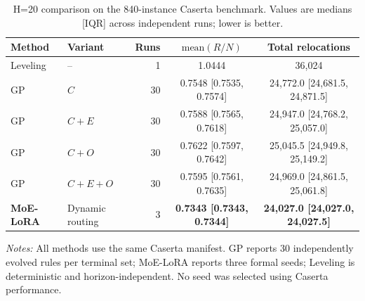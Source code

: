 \begin{table}[t]
  \centering
  \caption{H=20 comparison on the 840-instance Caserta benchmark. Values are
  medians [IQR] across independent runs; lower is better.}
  \label{tab:gp_moe_leveling_h20}
  \setlength{\tabcolsep}{4.5pt}
  \renewcommand{\arraystretch}{1.08}
  \small
  \begin{tabular}{llrcc}
    \toprule
    Method & Variant & Runs & $\mathrm{mean}(R/N)$ & Total relocations \\
    \midrule
    Leveling & -- & 1 & 1.0444 & 36,024 \\
    GP & $C$ & 30 & 0.7548 [0.7535, 0.7574] & 24,772.0 [24,681.5, 24,871.5] \\
    GP & $C{+}E$ & 30 & 0.7588 [0.7565, 0.7618] & 24,947.0 [24,768.2, 25,057.0] \\
    GP & $C{+}O$ & 30 & 0.7622 [0.7597, 0.7642] & 25,045.5 [24,949.8, 25,149.2] \\
    GP & $C{+}E{+}O$ & 30 & 0.7595 [0.7561, 0.7635] & 24,969.0 [24,861.5, 25,061.8] \\
    \textbf{MoE-LoRA} & Dynamic routing & 3 & \textbf{0.7343 [0.7343, 0.7344]} & \textbf{24,027.0 [24,027.0, 24,027.5]} \\
    \bottomrule
  \end{tabular}
  \vspace{2pt}
  \parbox{0.98\linewidth}{\footnotesize \textit{Notes:} All methods use the
  same Caserta manifest. GP reports 30 independently evolved rules per terminal
  set; MoE-LoRA reports three formal seeds; Leveling is deterministic and
  horizon-independent. No seed was selected using Caserta performance.}
\end{table}
